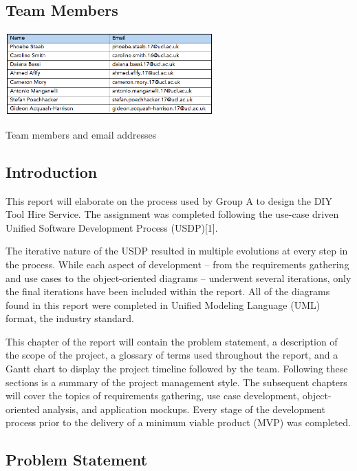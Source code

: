 \documentclass[fontsize=11pt]{extarticle}
\numberwithin{figure}{section} %
\numberwithin{table}{section}%
\begin{document}
\hypertarget{team-members}{%
\subsection{Team Members}\label{team-members}}

\begin{table}[H]
      \centering
      \includegraphics[trim = 0 0 0 0, clip, width=0.6\textwidth]{TempImg/teamtable.png}
      \caption{Team members and email addresses}
\label{conreq}
 \end{table}

\hypertarget{introduction}{%
\subsection{Introduction}\label{introduction}}

This report will elaborate on the process used by Group A to design the
DIY Tool Hire Service. The assignment was completed following the
use-case driven Unified Software Development Process (USDP){[}1{]}.

The iterative nature of the USDP resulted in multiple evolutions at
every step in the process. While each aspect of development -- from the
requirements gathering and use cases to the object-oriented diagrams --
underwent several iterations, only the final iterations have been
included within the report. All of the diagrams found in this report
were completed in Unified Modeling Language (UML) format, the industry
standard.

This chapter of the report will contain the problem statement, a
description of the scope of the project, a glossary of terms used
throughout the report, and a Gantt chart to display the project timeline
followed by the team. Following these sections is a summary of the
project management style. The subsequent chapters will cover the topics
of requirements gathering, use case development, object-oriented
analysis, and application mockups. Every stage of the development
process prior to the delivery of a minimum viable product (MVP) was
completed.

\hypertarget{problem-statement}{%
\subsection{Problem Statement}\label{problem-statement}}
\end{document}
